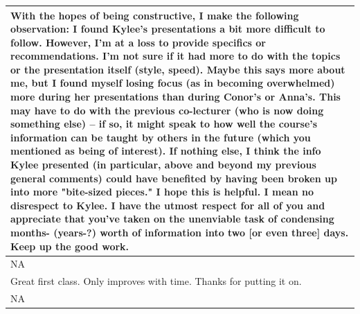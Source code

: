 \documentclass[]{article}
\begin{document}
\begin{table}[H]
\begin{tabular}{l}
\hline
With the hopes of being constructive, I make the following observation: I found Kylee's presentations a bit more difficult to follow. However, I'm at a loss to provide specifics or recommendations. I'm not sure if it had more to do with the topics or the presentation itself (style, speed). Maybe this says more about me, but I found myself losing focus (as in becoming overwhelmed) more during her presentations than during Conor's or Anna's. This may have to do with the previous co-lecturer (who is now doing something else) -- if so, it might speak to how well the course's information can be taught by others in the future (which you mentioned as being of interest). If nothing else, I think the info Kylee presented (in particular, above and beyond my previous general comments) could have benefited by having been broken up into more "bite-sized pieces." I hope this is helpful. I mean no disrespect to Kylee. I have the utmost respect for all of you and appreciate that you've taken on the unenviable task of condensing months- (years-?) worth of information into two [or even three] days. Keep up the good work.\\
\hline
NA\\
\hline
Great first class. Only improves with time. Thanks for putting it on.\\
\hline
NA\\
\hline
\end{tabular}
\end{table}
\end{document}
